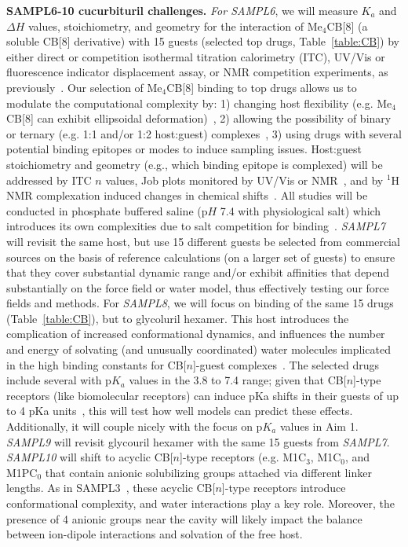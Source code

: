 \documentclass[11pt]{article}
\begin{document}
\textbf{SAMPL6-10 cucurbituril challenges.} 
\emph{For SAMPL6}, we will measure $K_a$ and $\Delta H$ values, stoichiometry, and geometry for the interaction of Me$_4$CB[8] (a soluble CB[8] derivative) with 15 guests (selected top drugs, Table~\ref{table:CB}) by either direct or competition isothermal titration calorimetry (ITC), UV/Vis or fluorescence indicator displacement assay, or NMR competition experiments, as previously~\cite{cao_attomolar_2014, liu_cucurbituril_2005, ma_acyclic_2010, she_glycoluril-derived_2016}.  
Our selection of Me$_4$CB[8] binding to top drugs allows us to modulate the computational complexity by: 1) changing host flexibility (e.g. Me$_4$CB[8] can exhibit ellipsoidal deformation)~\cite{vinciguerra_synthesis_2015}, 2) allowing the possibility of binary or ternary (e.g. 1:1 and/or 1:2 host:guest) complexes~\cite{ko_supramolecular_2007, barrow_cucurbituril-based_2015, urbach_molecular_2011}, 3) using drugs with several potential binding epitopes or modes to induce sampling issues.  Host:guest stoichiometry and geometry (e.g., which binding epitope is complexed) will be addressed by ITC $n$ values, Job plots monitored by UV/Vis or NMR~\cite{connors_binding_1987}, and by $^1$H NMR complexation induced changes in chemical shifts~\cite{masson_cucurbituril_2012}.  
All studies will be conducted in phosphate buffered saline (p$H$ 7.4 with physiological salt) which introduces its own complexities due to salt competition for binding~\cite{marquez_mechanism_2004, mobley_predicting_2016}. 
\emph{SAMPL7} will revisit the same host, but use 15 different guests be selected from commercial sources on the basis of reference calculations (on a larger set of guests) to ensure that they cover substantial dynamic range and/or exhibit affinities that depend substantially on the force field or water model, thus effectively testing our force fields and methods.
For \emph{SAMPL8}, we will focus on binding of the same 15 drugs (Table~\ref{table:CB}), but to glycoluril hexamer. 
This host introduces the complication of increased conformational dynamics, and influences the number and energy of solvating (and unusually coordinated) water molecules implicated in the high binding constants for CB[$n$]-guest complexes~\cite{biedermann_release_2012, biedermann_hydrophobic_2014}.  
The selected drugs include several with p$K_a$ values in the 3.8 to 7.4 range; given that CB[$n$]-type receptors (like biomolecular receptors) can induce pKa shifts in their guests of up to 4 pKa units~\cite{saleh_activation_2008, nau_deep_2011, ghosh_strategic_2012}, this will test how well models can predict these effects. 
Additionally, it will couple nicely with the focus on p$K_a$ values in Aim 1.
\emph{SAMPL9} will revisit glycouril hexamer with the same 15 guests from \emph{SAMPL7}.
\emph{SAMPL10} will shift to acyclic CB[$n$]-type receptors (e.g. M1C$_3$, M1C$_0$, and M1PC$_0$ that contain anionic solubilizing groups attached via different linker lengths.  
As in SAMPL3~\cite{muddana_sampl3_2012}, these acyclic CB[$n$]-type receptors introduce conformational complexity, and water interactions play a key role.
Moreover, the presence of 4 anionic groups near the cavity will likely impact the balance between ion-dipole interactions and solvation of the free host.
\end{document}
